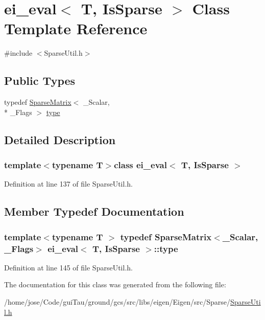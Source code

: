 \hypertarget{classei__eval_3_01_t_00_01_is_sparse_01_4}{\section{ei\-\_\-eval$<$ T, Is\-Sparse $>$ Class Template Reference}
\label{classei__eval_3_01_t_00_01_is_sparse_01_4}
}


{\ttfamily \#include $<$Sparse\-Util.\-h$>$}

\subsection*{Public Types}
\begin{DoxyCompactItemize}
\item 
typedef \hyperlink{class_sparse_matrix}{Sparse\-Matrix}$<$ \-\_\-\-Scalar, \\*
\-\_\-\-Flags $>$ \hyperlink{classei__eval_3_01_t_00_01_is_sparse_01_4_ad31dcb461a275faaf2e89652e45240dc}{type}
\end{DoxyCompactItemize}


\subsection{Detailed Description}
\subsubsection*{template$<$typename T$>$class ei\-\_\-eval$<$ T, Is\-Sparse $>$}



Definition at line 137 of file Sparse\-Util.\-h.



\subsection{Member Typedef Documentation}
\hypertarget{classei__eval_3_01_t_00_01_is_sparse_01_4_ad31dcb461a275faaf2e89652e45240dc}{
\subsubsection[{type}]{\setlength{\rightskip}{0pt plus 5cm}template$<$typename T $>$ typedef {\bf Sparse\-Matrix}$<$\-\_\-\-Scalar, \-\_\-\-Flags$>$ {\bf ei\-\_\-eval}$<$ T, {\bf Is\-Sparse} $>$\-::{\bf type}}}\label{classei__eval_3_01_t_00_01_is_sparse_01_4_ad31dcb461a275faaf2e89652e45240dc}


Definition at line 145 of file Sparse\-Util.\-h.



The documentation for this class was generated from the following file\-:\begin{DoxyCompactItemize}
\item 
/home/jose/\-Code/gui\-Tau/ground/gcs/src/libs/eigen/\-Eigen/src/\-Sparse/\hyperlink{_sparse_util_8h}{Sparse\-Util.\-h}\end{DoxyCompactItemize}

